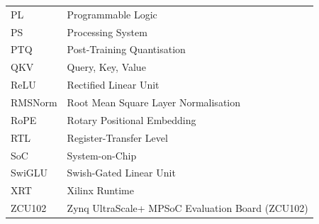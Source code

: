 \begin{longtable}{@{}ll}
  PL      & Programmable Logic \\
  PS      & Processing System \\
  PTQ     & Post-Training Quantisation \\
  QKV     & Query, Key, Value \\
  ReLU    & Rectified Linear Unit \\
  RMSNorm & Root Mean Square Layer Normalisation \\
  RoPE    & Rotary Positional Embedding \\
  RTL     & Register-Transfer Level \\
  SoC     & System-on-Chip \\
  SwiGLU  & Swish-Gated Linear Unit \\
  XRT     & Xilinx Runtime \\
  ZCU102  & Zynq UltraScale+ MPSoC Evaluation Board (ZCU102) \\
\end{longtable}
